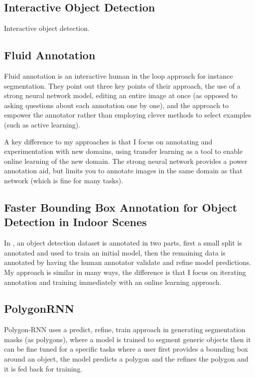 \subsection {Interactive Object Detection}
\cite{Yao2012} Interactive object detection. 

\subsection{Fluid Annotation}
Fluid annotation \cite{Andriluka} is an interactive human in the loop approach for instance segmentation. They point out three key points of their approach, the use of a strong neural network model, editing an entire image at once (as opposed to asking questions about each annotation one by one), and the approach to empower the annotator rather than employing clever methods to select examples (such as active learning).

A key difference to my approaches is that I focus on annotating and experimentation with new domains, using transfer learning as a tool to enable online learning of the new domain. The strong neural network provides a power annotation aid, but limits you to annotate images in the same domain as that network (which is fine for many tasks).

\subsection{Faster Bounding Box Annotation for Object Detection in Indoor Scenes}
In \cite{Adhikaria2018}, an object detection dataset is annotated in two parts, first a small split is annotated and used to train an initial model, then the remaining data is annotated by having the human annotator validate and refine model predictions. My approach is similar in many ways, the difference is that I focus on iterating annotation and training immediately with an online learning approach.

\subsection {PolygonRNN}
Polygon-RNN \cite{Castrejon2017} uses a predict, refine, train approach in generating segmentation masks (as polygons), where a model is trained to segment generic objects then it can be fine tuned for a specific tasks where a user first provides a bounding box around an object, the model predicts a polygon and the refines the polygon and it is fed back for training.

